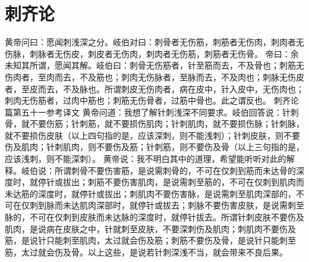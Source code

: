 \documentclass[a4paper,12pt,UTF8,twoside]{ctexbook}
\begin{document}
\chapter{刺齐论}
黄帝问曰：愿闻刺浅深之分。岐伯对曰：刺骨者无伤筋，刺筋者无伤肉，刺肉者无伤脉，刺脉者无伤皮，刺皮者无伤肉，刺肉者无伤筋，刺筋者无伤骨。
帝曰：余未知其所谓，愿闻其解。岐伯曰：刺骨无伤筋者，针至筋而去，不及骨也；刺筋无伤肉者，至肉而去，不及筋也；刺肉无伤脉者，至脉而去，不及肉也；刺脉无伤皮者，至皮而去，不及脉也。所谓刺皮无伤肉者，病在皮中，针入皮中，无伤肉也；刺肉无伤筋者，过肉中筋也；刺筋无伤骨者，过筋中骨也。此之谓反也。
刺齐论篇第五十一参考译文
黄帝问道：我想了解针刺浅深不同要求。岐伯回答说：针刺骨，就不要伤筋；针刺筋，就不要损伤肌肉；针刺肌肉，就不要损伤脉；针刺脉，就不要损伤皮肤（以上四句指的是，应该深刺，则不能浅刺）；针刺皮肤，则不要伤及肌肉；针刺肌肉，则不要伤及筋；针刺筋，则不要伤及骨（以上三句指的是，应该浅刺，则不能深刺）。
黄帝说：我不明白其中的道理，希望能听听对此的解释。岐伯说：所谓刺骨不要伤害筋，是说需刺骨的，不可在仅刺到筋而未达骨的深度时，就停针或拔出；刺筋不要伤害肌肉，是说需刺至筋的，不可在仅刺到肌肉而未达筋的深度时，就停针或拔出；刺肌肉不要伤害脉，是说需刺至肌肉深部的，不可在仅刺到脉而未达肌肉深部时，就停针或拔去；刺脉不要伤害皮肤，是说需刺至脉的，不可在仅刺到皮肤而未达脉的深度时，就停针拔去。所谓针刺皮肤不要伤及肌肉，是说病在皮肤之中，针就刺至皮肤，不要深刺伤及肌肉；刺肌肉不要伤及筋，是说针只能刺至肌肉，太过就会伤及筋；刺筋不要伤及骨，是说针只能刺至筋，太过就会伤及骨。以上这些，是说若针刺深浅不当，就会带来不良后果。
\end{document}
